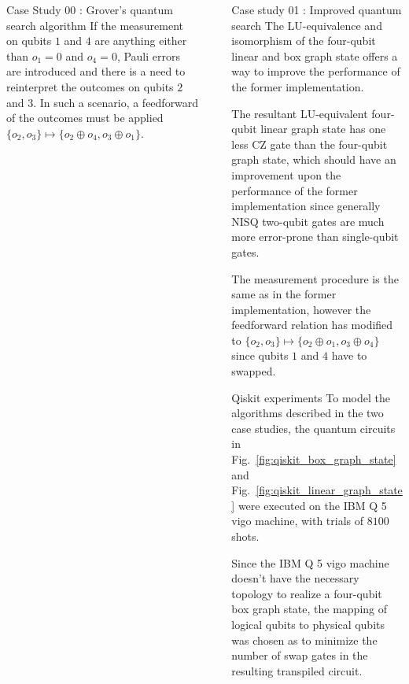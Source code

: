 \documentclass[final]{beamer}
\newlength{\sepwidth}
\newlength{\colwidth}
\newcommand{\separatorcolumn}{\begin{column}{\sepwidth}\end{column}}
\begin{document}
\begin{frame}[t]
\begin{columns}[t]
\begin{column}{\colwidth}
\begin{block}{Case Study 00 : Grover's quantum search algorithm}
                    If the measurement on qubits $1$ and $4$ are anything either
                    than $o_1= 0$ and $o_4= 0$, Pauli errors are introduced and
                    there is a need to reinterpret the outcomes on qubits $2$ and $3$. In such a scenario, a
                    feedforward of the outcomes must be applied $\{o_2, o_3\}
                    \mapsto \{o_2 \oplus o_4, o_3 \oplus o_ 1\}$.
                \end{block}
            \end{column}

            \separatorcolumn

            \begin{column}{\colwidth}
                \begin{block}{Case study 01 : Improved quantum search}
                    The LU-equivalence and isomorphism of the four-qubit linear and box
                    graph state offers a way to improve the performance of the
                    former implementation.

                    The resultant LU-equivalent four-qubit
                    linear graph state has one less $\text{CZ}$ gate than the
                    four-qubit graph state, which should have an improvement  upon
                    the performance of the former implementation since generally
                    NISQ two-qubit gates are much more error-prone than single-qubit gates.

                    The measurement procedure is the same as in the former
                    implementation, however the feedforward relation has
                    modified to $\{o_2, o_3\} \mapsto \{o_2 \oplus o_1, o_3 \oplus o_4 \}$ since
                    qubits $1$ and $4$ have to swapped.
                \end{block}
                \begin{block}{Qiskit experiments}
                    To model the algorithms described in the two case studies, the
                    quantum circuits in Fig.~\ref{fig:qiskit_box_graph_state}
                    and Fig.~\ref{fig:qiskit_linear_graph_state} were executed on the
                    IBM Q 5 vigo machine, with trials of $8100$ shots.

                    Since the IBM Q 5 vigo machine doesn't have the necessary
                    topology to realize a four-qubit box graph state, the
                    mapping of logical qubits to physical qubits was chosen as to minimize the
                    number of swap gates in the resulting transpiled circuit.


\end{block}
\end{column}
\end{columns}
\end{frame}
\end{document}
